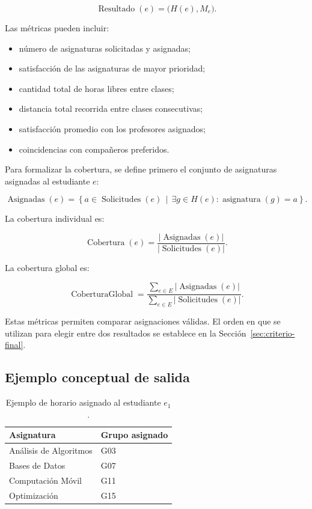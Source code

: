 \documentclass[11pt]{article}
\numberwithin{equation}{section}
\numberwithin{figure}{section}
\numberwithin{table}{section}
\theoremstyle{definition}
\begin{document}
\[
\operatorname{Resultado}(e)=\bigl(H(e),M_e\bigr).
\]

Las métricas pueden incluir:

\begin{itemize}
  \item número de asignaturas solicitadas y asignadas;
  \item satisfacción de las asignaturas de mayor prioridad;
  \item cantidad total de horas libres entre clases;
  \item distancia total recorrida entre clases consecutivas;
  \item satisfacción promedio con los profesores asignados;
  \item coincidencias con compañeros preferidos.
\end{itemize}

Para formalizar la cobertura, se define primero el conjunto de asignaturas
asignadas al estudiante $e$:

\[
\operatorname{Asignadas}(e)=
\left\{a\in\operatorname{Solicitudes}(e)\,\middle|\,
\exists g\in H(e):\operatorname{asignatura}(g)=a\right\}.
\]

La cobertura individual es:

\[
\operatorname{Cobertura}(e)=
\frac{|\operatorname{Asignadas}(e)|}
     {|\operatorname{Solicitudes}(e)|}.
\]

La cobertura global es:

\[
\operatorname{CoberturaGlobal}=
\frac{\displaystyle\sum_{e\in E}|\operatorname{Asignadas}(e)|}
     {\displaystyle\sum_{e\in E}|\operatorname{Solicitudes}(e)|}.
\]

Estas métricas permiten comparar asignaciones válidas. El orden en que se
utilizan para elegir entre dos resultados se establece en la
Sección~\ref{sec:criterio-final}.

\subsection{Ejemplo conceptual de salida}

\begin{table}[H]
\centering
\caption{Ejemplo de horario asignado al estudiante $e_1$.}
\begin{tabular}{ll}
\toprule
\textbf{Asignatura} & \textbf{Grupo asignado} \\
\midrule
Análisis de Algoritmos & G03 \\
Bases de Datos         & G07 \\
Computación Móvil      & G11 \\
Optimización           & G15 \\
\bottomrule
\end{tabular}
\end{table}
\end{document}

